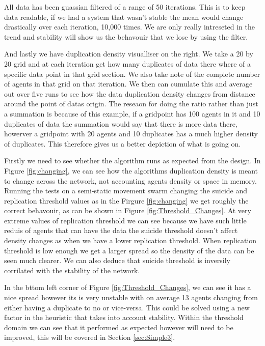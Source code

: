 \documentclass{UoYCSproject}
\begin{document}
All data has been guassian filtered of a range of 50 iterations.
This is to keep data readable, if we had a system that wasn't stable the mean would change drastically over each iteration, 10,000 times.
We are only really intreseted in the trend and stability will show us the behavouir that we lose by using the filter.

And lastly we have duplication density visualliser on the right.
We take a 20 by 20 grid and at each iteration get how many duplicates of data there where of a specific data point in that grid section.
We also take note of the complete number of agents in that grid on that iteration.
We then can cumulate this and average out over five runs to see how the data duplication density changes from distance around the point of datas origin.
The reseaon for doing the ratio rather than just a summation is because of this example, if a gridpoint has 100 agents in it and 10 duplicates of data the summation would say that there is more data there, howerver a gridpoint with 20 agents and 10 duplicates has a much higher density of duplicates.
This therefore gives us a better depiction of what is going on.

Firstly we need to see whether the algorithm runs as expected from the design.
In Figure \ref{fig:changing}, we can see how the algorithms duplication density is meant to change across the network, not accounting agents density or space in memory.
Running the tests on a semi-static movement swarm changing the suicide and replication threshold values as in the Firgure \ref{fig:changing} we get roughly the correct behavouir, as can be shown in Figure \ref{fig:Threshold_Changes}.
At very extreme values of replication threshold we can see because we have such little reduis of agents that can have the data the suicide threshold doesn't affect density changes as when we have a lower replication threshold.
When replication threshold is low enough we get a larger spread so the density of the data can be seen much clearer.
We can also deduce that suicide threshold is inversily corrilated with the stability of the network.

In the bttom left corner of Figure \ref{fig:Threshold_Changes}, we can see it has a nice spread however its is very unstable with on average 13 agents changing from either having a duplicate to no or vice-versa.
This could be solved using a new factor in the heuristic that takes into account stability.
Within the threshold domain we can see that it performed as expected however will need to be improved, this will be covered in Section \ref{sec:Simple3}.
\end{document}
